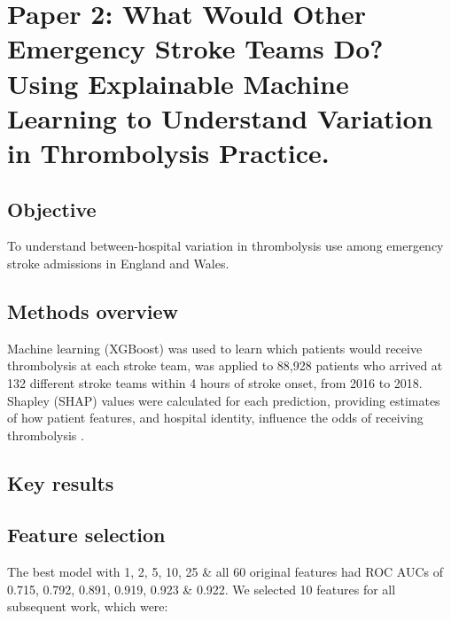 \section{Paper 2: What Would Other Emergency Stroke Teams Do? Using Explainable Machine Learning to Understand Variation in Thrombolysis Practice.\cite{pearn_what_2023}}\label{sec:paper_2}

\subsection{Objective}

To understand between-hospital variation in thrombolysis use among emergency stroke admissions in England and Wales.

\subsection{Methods overview}

Machine learning (XGBoost\cite{chen_xgboost_2016}) was used to learn which patients would receive thrombolysis at each stroke team, was applied to 88,928 patients who arrived at 132 different stroke teams within 4 hours of stroke onset, from 2016 to 2018. Shapley (SHAP) values were calculated for each prediction, providing estimates of how patient features, and hospital identity, influence the odds of receiving thrombolysis \cite{lundberg_unified_2017}.

\subsection{Key results}

\subsection{Feature selection}

The best model with 1, 2, 5, 10, 25 \& all 60 original features had ROC AUCs of 0.715, 0.792, 0.891, 0.919, 0.923 \& 0.922. We selected 10 features for all subsequent work, which were:

